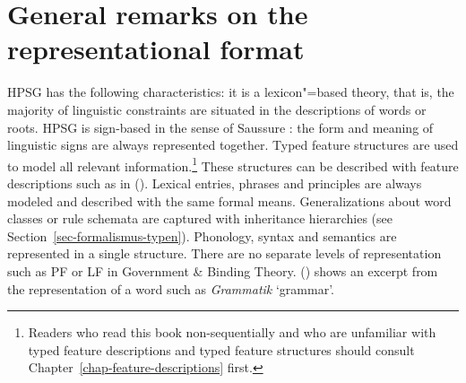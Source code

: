 \section{General remarks on the representational format}

HPSG has the following characteristics: it is a lexicon"=based theory, that is, the majority of
linguistic constraints are situated in the descriptions of words or roots. HPSG is sign-based in the
sense of Saussure \citeyearpar{Saussure16a-Fr}\nocite{Saussure16a}: the form and meaning of linguistic signs are always
represented together. Typed feature structures are used to model all relevant information.\footnote{%
Readers who read this book non-sequentially and who are unfamiliar with typed feature descriptions
and typed feature structures should consult Chapter~\ref{chap-feature-descriptions} first.
} These
structures can be described with feature descriptions such as in (). Lexical entries, phrases
and principles are always modeled and described with the same formal means.  Generalizations about
word classes or rule schemata are captured with inheritance hierarchies (see Section~\ref{sec-formalismus-typen}). Phonology, syntax and
semantics are represented in a single structure. There are no separate levels of representation such
as PF or LF in Government \& Binding Theory.  () shows an excerpt from the representation of
a word such as \emph{Grammatik} `grammar'.

